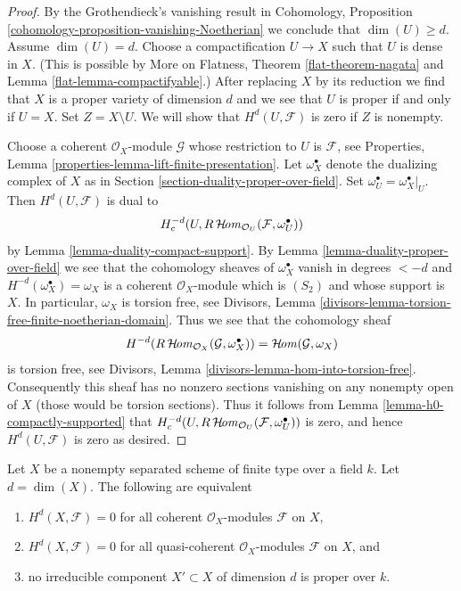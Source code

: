 \begin{proof}
By the Grothendieck's vanishing result in
Cohomology, Proposition \ref{cohomology-proposition-vanishing-Noetherian}
we conclude that $\dim(U) \geq d$.
Assume $\dim(U) = d$. Choose a compactification $U \to X$
such that $U$ is dense in $X$. (This is possible by
More on Flatness, Theorem \ref{flat-theorem-nagata} and
Lemma \ref{flat-lemma-compactifyable}.) After replacing $X$ by its
reduction we find that $X$ is a proper variety of dimension $d$
and we see that $U$ is proper if and only if $U = X$.
Set $Z = X \setminus U$. We will show that $H^d(U, \mathcal{F})$
is zero if $Z$ is nonempty.

\medskip\noindent
Choose a coherent $\mathcal{O}_X$-module
$\mathcal{G}$ whose restriction to $U$ is $\mathcal{F}$, see
Properties, Lemma \ref{properties-lemma-lift-finite-presentation}.
Let $\omega_X^\bullet$ denote the dualizing complex of $X$ as in
Section \ref{section-duality-proper-over-field}.
Set $\omega_U^\bullet = \omega_X^\bullet|_U$.
Then $H^d(U, \mathcal{F})$ is dual to
$$
H^{-d}_c(U, R\mathop{\mathcal{H}\!\mathit{om}}\nolimits_{\mathcal{O}_U}(\mathcal{F}, \omega_U^\bullet))
$$
by Lemma \ref{lemma-duality-compact-support}. By
Lemma \ref{lemma-duality-proper-over-field} we see that
the cohomology sheaves of $\omega_X^\bullet$ vanish in degrees $< -d$
and $H^{-d}(\omega_X^\bullet) = \omega_X$ is a coherent
$\mathcal{O}_X$-module which is $(S_2)$ and whose support is $X$.
In particular, $\omega_X$ is torsion free, see
Divisors, Lemma \ref{divisors-lemma-torsion-free-finite-noetherian-domain}.
Thus we see that the cohomology sheaf
$$
H^{-d}(R\mathop{\mathcal{H}\!\mathit{om}}\nolimits_{\mathcal{O}_X}(\mathcal{G}, \omega_X^\bullet)) =
\mathop{\mathcal{H}\!\mathit{om}}\nolimits(\mathcal{G}, \omega_X)
$$
is torsion free, see
Divisors, Lemma \ref{divisors-lemma-hom-into-torsion-free}.
Consequently this sheaf has no nonzero sections vanishing
on any nonempty open of $X$ (those would be torsion sections).
Thus it follows from Lemma \ref{lemma-h0-compactly-supported} that
$H^{-d}_c(U, R\mathop{\mathcal{H}\!\mathit{om}}\nolimits_{\mathcal{O}_U}(\mathcal{F}, \omega_U^\bullet))$
is zero, and hence $H^d(U, \mathcal{F})$ is zero as desired.
\end{proof}

\begin{theorem}
\label{theorem-lichtenbaum}
Let $X$ be a nonempty separated scheme of finite type over a field $k$.
Let $d = \dim(X)$. The following are equivalent
\begin{enumerate}
\item $H^d(X, \mathcal{F}) = 0$ for all coherent $\mathcal{O}_X$-modules
$\mathcal{F}$ on $X$,
\item $H^d(X, \mathcal{F}) = 0$ for all quasi-coherent $\mathcal{O}_X$-modules
$\mathcal{F}$ on $X$, and
\item no irreducible component $X' \subset X$ of dimension $d$
is proper over $k$.
\end{enumerate}
\end{theorem}

